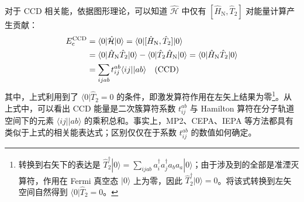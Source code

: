 对于 CCD 相关能，依据图形理论，可以知道 $\hat{\mathcal{H}}$ 中仅有 $[\hat H_\mathrm{N}, \hat T_2]$ 对能量计算产生贡献：
\begin{align}
  \label{eq.ccd-corr-energy}
  E_\mathrm{c}^\mathrm{CCD} &= \langle 0 | \hat{\mathcal{H}} | 0 \rangle = \langle 0 | [\hat H_\mathrm{N}, \hat T_2] | 0 \rangle \notag\\
  &= \langle 0 | \hat H_\mathrm{N} \hat T_2 | 0 \rangle - \langle 0 | \hat T_2 \hat H_\mathrm{N} | 0 \rangle = \langle 0 | \hat H_\mathrm{N} \hat T_2 | 0 \rangle \notag\\
  &= \sum_{ijab} t_{ij}^{ab} \langle ij || ab \rangle \quad \text{(CCD)}
\end{align}
其中，上式利用到了 $\langle 0 | \hat T_2 = 0$ 的条件，即激发算符作用在左矢上结果为零\footnote{转换到右矢下的表达是 $\hat T_2^\dagger | 0 \rangle = \sum_{ijab} a_i^\dagger a_j^\dagger a_b a_a | 0 \rangle$；由于涉及到的全部是准湮灭算符，作用在 Fermi 真空态 $| 0 \rangle$ 上为零，因此 $\hat T_2^\dagger | 0 \rangle = 0$。将该式转换到左矢空间自然得到 $\langle 0 | \hat T_2 = 0$。}。从上式中，可以看出 CCD 能量是二次簇算符系数 $t_{ij}^{ab}$ 与 Hamilton 算符在分子轨道空间下的元素 $\langle ij || ab \rangle$ 的乘积总和。事实上，MP2、CEPA、IEPA 等方法都具有类似于上式的相关能表达式；区别仅仅在于系数 $t_{ij}^{ab}$ 的数值如何确定。

